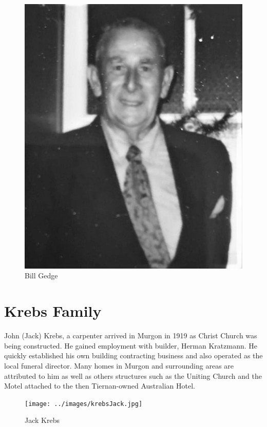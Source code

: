 \begin{figure}
\begin{center}
\includegraphics[width=.6\linewidth,center]{../images/BillGedge.jpg}
\caption{Bill Gedge}
\end{center}
\end{figure}




\section{Krebs Family}



John (Jack) Krebs, a carpenter arrived in Murgon in 1919 as Christ Church was being constructed. He gained employment with builder, Herman Kratzmann. He quickly established his own building contracting business and also operated as the local funeral director. Many homes in Murgon and surrounding areas are attributed to him as well as others structures such as the Uniting Church and the Motel attached to the then Tiernan-owned Australian Hotel.









\begin{figure}
\begin{center}
\texttt{[image: ../images/krebsJack.jpg]}
\caption{Jack Krebs}
\end{center}
\end{figure}




